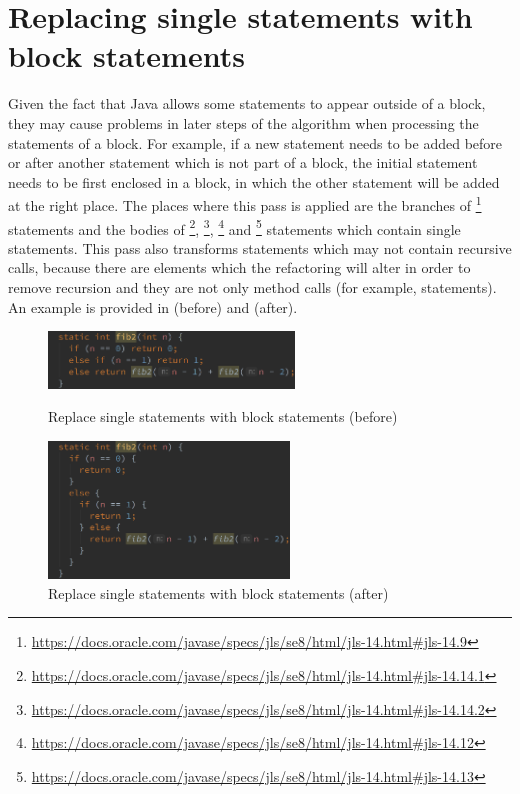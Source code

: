 \section{Replacing single statements with block statements}

Given the fact that Java allows some statements to appear outside of a block, they may cause problems in later steps of
the algorithm when processing the statements of a block. For example, if a new statement needs to be added before or
after another statement which is not part of a block, the initial statement needs to be first enclosed in a block, in
which the other statement will be added at the right place. The places where this pass is applied are the branches of
\footnote{\url{https://docs.oracle.com/javase/specs/jls/se8/html/jls-14.html#jls-14.9}} statements and the
bodies of \footnote{\url{https://docs.oracle.com/javase/specs/jls/se8/html/jls-14.html#jls-14.14.1}},
\footnote{\url{https://docs.oracle.com/javase/specs/jls/se8/html/jls-14.html#jls-14.14.2}},
\footnote{\url{https://docs.oracle.com/javase/specs/jls/se8/html/jls-14.html#jls-14.12}} and
\footnote{\url{https://docs.oracle.com/javase/specs/jls/se8/html/jls-14.html#jls-14.13}} statements
which contain single statements. This pass also transforms statements which may not contain recursive calls, because
there are elements which the refactoring will alter in order to remove recursion and they are not only method calls (for
example,  statements). An example is provided in 
(before) and  (after).

\begin{figure}[htb]
    \centering
    \begin{minipage}[b]{0.45\textwidth}
        \centering
        \includegraphics[height=0.6in]{src/img/replace-single-statements-with-block-statements-before.png}
        \caption{Replace single statements with block statements (before) \label{img:replace-single-statements-with-block-statements-before}}
    \end{minipage}
    \hfill
    \begin{minipage}[b]{0.45\textwidth}
        \centering
        \includegraphics[height=1.44in]{src/img/replace-single-statements-with-block-statements-after.png}
        \caption{Replace single statements with block statements (after) \label{img:replace-single-statements-with-block-statements-after}}
    \end{minipage}
\end{figure}